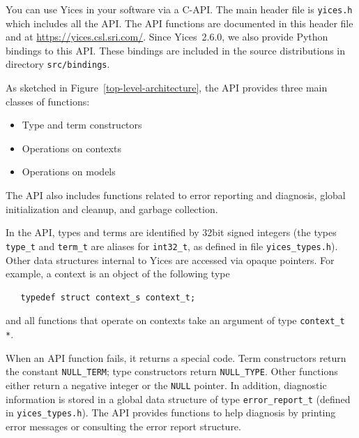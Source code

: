 \documentclass[11pt,twoside,fleqn,openright,titlepage]{cslreport}
\begin{document}

You can use Yices in your software via a C-API. The main header file
is \texttt{yices.h} which includes all the API. The API functions are
documented in this header file and at
\url{https://yices.csl.sri.com/}. Since Yices~2.6.0, we also provide
Python bindings to this API. These bindings are included in the source
distributions in directory \texttt{src/bindings}.

\medskip\noindent
As sketched in Figure~\ref{top-level-architecture}, the API provides
three main classes of functions:
\begin{itemize}
\item Type and term constructors
\item Operations on contexts
\item Operations on models
\end{itemize}
The API also includes functions related to error reporting and
diagnosis, global initialization and cleanup, and garbage collection.

\medskip\noindent
In the API, types and terms are identified by 32bit signed integers
(the types \texttt{type\_t} and \texttt{term\_t} are aliases for
\texttt{int32\_t}, as defined in file \texttt{yices\_types.h}). Other
data structures internal to Yices are accessed via opaque
pointers. For example, a context is an object of the following type
\begin{small}
\begin{verbatim}
   typedef struct context_s context_t;
\end{verbatim}
\end{small}
and all functions that operate on contexts take an argument of type
\texttt{context\_t *}.

\medskip\noindent
When an API function fails, it returns a special code. Term
constructors return the constant \texttt{NULL\_TERM}; type
constructors return \texttt{NULL\_TYPE}. Other functions either return
a negative integer or the \texttt{NULL} pointer. In addition,
diagnostic information is stored in a global data structure of type
\texttt{error\_report\_t} (defined in \texttt{yices\_types.h}). The API
provides functions to help diagnosis by printing error messages or
consulting the error report structure.
\end{document}
